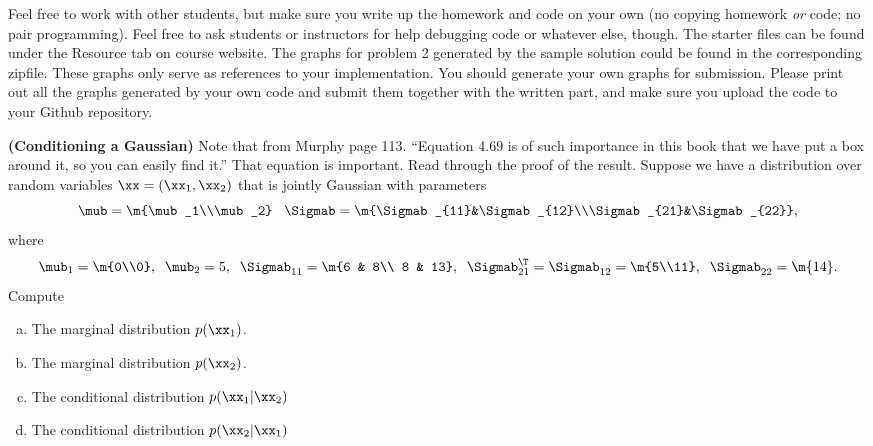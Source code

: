 \documentclass[12pt,letterpaper,fleqn]{hmcpset}
\begin{document}
Feel free to work with other students, but make sure you write up the homework
and code on your own (no copying homework \textit{or} code; no pair programming).
Feel free to ask students or instructors for help debugging code or whatever else,
though.
\newline
\newline
The starter files can be found under the Resource tab on course website. The graphs for problem 2 generated by the sample solution could be found in the corresponding zipfile. These graphs only serve as references to your implementation. You should generate your own graphs for submission. Please print out all the graphs generated by your own code and submit them together with the written part, and make sure you upload the code to your Github repository.

\begin{problem}[1]
\textbf{(Conditioning a Gaussian)} Note that from Murphy page 113. ``Equation 4.69
is of such importance in this book that we have put a box around it, so you can easily
find it.'' That equation is important. Read through the proof of the result.
Suppose we have a distribution over random variables $\xx = (\xx_1, \xx_2)$ that is
jointly Gaussian with parameters
\[
    \mub = \m{\mub_1\\\mub_2}\;\;\; \Sigmab = \m{\Sigmab_{11}&\Sigmab_{12}\\\Sigmab_{21}&\Sigmab_{22}},
\]
where
\[
    \mub_1 = \m{0\\0}, \;\; \mub_2 = 5, \;\; \Sigmab_{11} = \m{6 & 8\\ 8 & 13}, \;\; \Sigmab_{21}^\T = \Sigmab_{12} = \m{5\\11}, \;\; \Sigmab_{22} = \m{14}.
\]
Compute
\begin{enumerate}[(a)]
    \item The marginal distribution $p(\xx_1)$.
    \item The marginal distribution $p(\xx_2)$.
    \item The conditional distribution $p(\xx_1 | \xx_2)$
    \item The conditional distribution $p(\xx_2 | \xx_1)$
\end{enumerate}

\end{problem}
\end{document}
